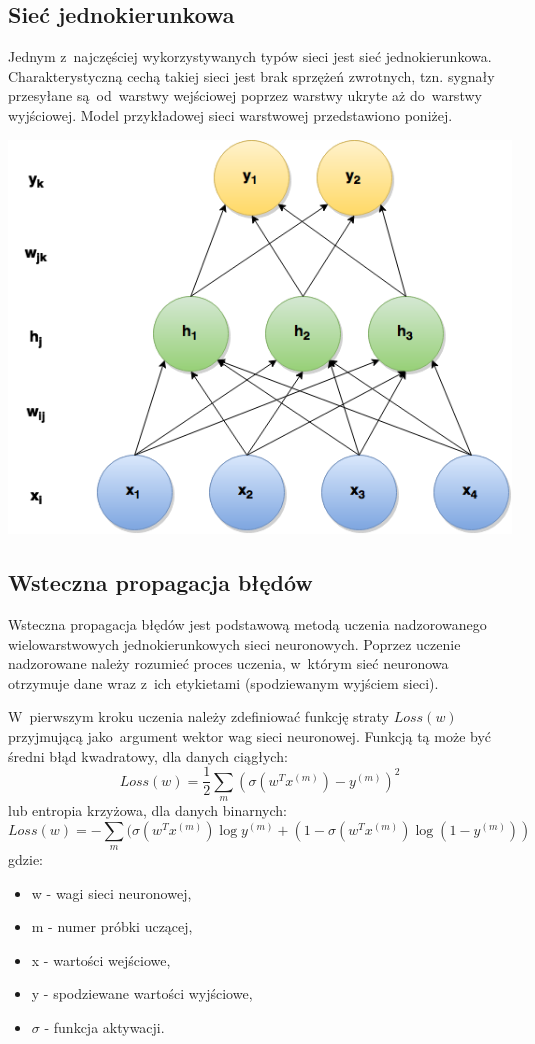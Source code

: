 \subsection{Sieć jednokierunkowa}
Jednym z~najczęściej wykorzystywanych typów sieci jest sieć jednokierunkowa. Charakterystyczną cechą takiej
sieci jest brak sprzężeń zwrotnych, tzn. sygnały przesyłane są~od~warstwy wejściowej poprzez warstwy ukryte
aż do~warstwy wyjściowej. Model przykładowej sieci warstwowej przedstawiono poniżej.

\begin{Figure}
	\centering
	\includegraphics[width=0.9\linewidth]{img/mgr_backprop_net.png}
\end{Figure}

\subsection{Wsteczna propagacja błędów} \label{ssec:backpropagation}
Wsteczna propagacja błędów jest podstawową metodą uczenia nadzorowanego wielowarstwowych jednokierunkowych
sieci neuronowych. Poprzez uczenie nadzorowane należy rozumieć proces uczenia, w~którym sieć neuronowa
otrzymuje dane wraz z~ich etykietami (spodziewanym wyjściem sieci).

W~pierwszym kroku uczenia należy zdefiniować funkcję straty $Loss(w)$ przyjmującą jako~argument wektor wag
sieci neuronowej. Funkcją tą może być średni błąd kwadratowy, dla danych ciągłych:\\
$$Loss(w)=\frac{1}{2}\sum\limits_{m}(\sigma(w^{T}x^{(m)}) - y^{(m)})^2$$
lub entropia krzyżowa, dla danych binarnych:
$$Loss(w)=-\sum\limits_m(\sigma(w^{T}x^{(m)})\log{y^{(m)}} + (1-\sigma(w^{T}x^{(m)})\log{(1-y^{(m)})})
$$
gdzie:
\begin{minipage}[t]{\textwidth}
\begin{itemize}
  \item w - wagi sieci neuronowej,
  \item m - numer próbki uczącej,
  \item x - wartości wejściowe,
  \item y - spodziewane wartości wyjściowe,
  \item $\sigma$ - funkcja aktywacji.
\end{itemize}
\end{minipage}

